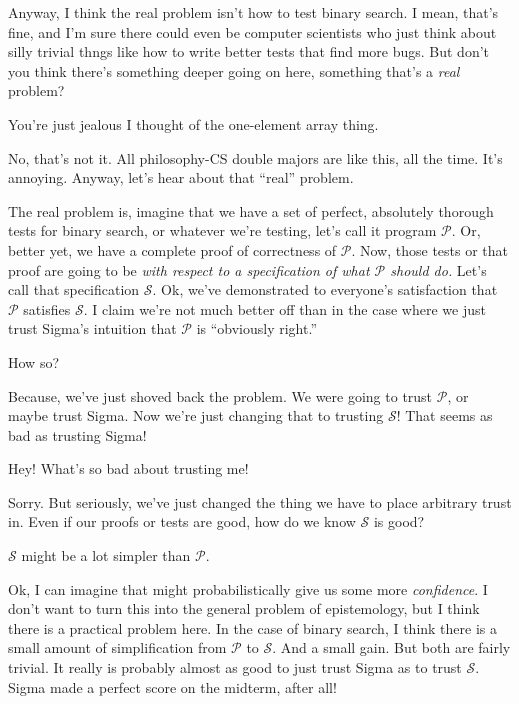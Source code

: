 \documentclass[sigplan]{acmart}
\begin{document}
  Anyway, I think the real problem isn't
how to test binary search.  I mean, that's fine, and I'm sure there
could even be computer scientists who just think about silly trivial
thngs like how to write better tests that find more bugs.  But don't
you think there's something deeper going on here, something that's a
\emph{real} problem?

  You're just jealous I thought of the
one-element array thing.

 No, that's not it.  All philosophy-CS
double majors are like this, all the time.  It's annoying. Anyway, let's hear about that ``real'' problem.

  The real problem is, imagine that we have
a set of perfect, absolutely thorough tests for binary search, or
whatever we're testing, let's call it program $\mathcal{P}$.  Or,
better yet, we have a complete proof of correctness of $\mathcal{P}$.
Now, those tests or that proof are going to be \emph{with respect to a
  specification of what $\mathcal{P}$ should do.}  Let's call that
specification $\mathcal{S}$.  Ok, we've demonstrated to everyone's
satisfaction that $\mathcal{P}$ satisfies $\mathcal{S}$.   I claim
we're not much better off than in the case where we just trust Sigma's
intuition that $\mathcal{P}$ is ``obviously right.''

 How so?

 Because, we've just shoved back the
problem.  We were going to trust $\mathcal{P}$, or maybe trust Sigma.
Now we're just changing that to trusting $\mathcal{S}$!  That seems as
bad as trusting Sigma!

 Hey!  What's so bad about trusting me!

 Sorry.  But seriously, we've just changed
the thing we have to place arbitrary trust in.  Even if our proofs or
tests are good, how do we know $\mathcal{S}$ is good?

 $\mathcal{S}$  might be a lot simpler than
$\mathcal{P}$.

 Ok, I can imagine that might
probabilistically give us some more \emph{confidence}.  I don't want
to turn this into the general problem of epistemology, but I think
there is a practical problem here.  In the case of binary search, I
think there is a small amount of simplification from 
$\mathcal{P}$ to $\mathcal{S}$.  And a small gain.  But both are
fairly trivial.  It really is probably almost as good to just trust
Sigma as to trust $\mathcal{S}$.  Sigma made a perfect score on the
midterm, after all!
\end{document}
